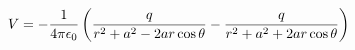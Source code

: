 \documentclass[preview]{standalone}
\begin{document}
\begin{align*}
V  =  - {1  \over  4\pi\epsilon_0}  \left(  {q  \over  r^2 + a^2 - 2ar\cos\theta}  -  {q  \over  r^2 + a^2 + 2ar\cos\theta}  \right)
\end{align*}
\end{document}
